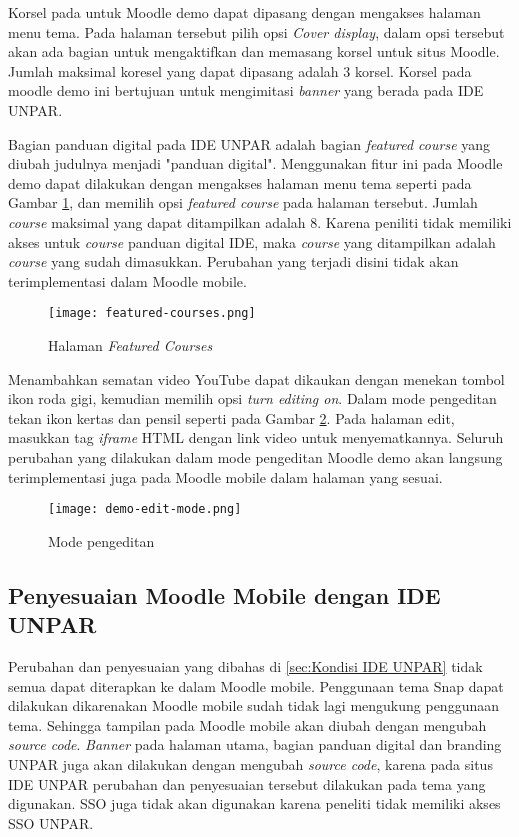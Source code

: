 Korsel pada untuk Moodle demo dapat dipasang dengan mengakses halaman menu tema. Pada halaman tersebut pilih opsi \textit{Cover display}, dalam opsi tersebut akan ada bagian untuk mengaktifkan dan memasang korsel untuk situs Moodle. Jumlah maksimal koresel yang dapat dipasang adalah 3 korsel. Korsel pada moodle demo ini bertujuan untuk mengimitasi \textit{banner} yang berada pada IDE UNPAR.

Bagian panduan digital pada IDE UNPAR adalah bagian \textit{featured course} yang diubah judulnya menjadi "panduan digital". Menggunakan fitur ini pada Moodle demo dapat dilakukan dengan mengakses halaman menu tema seperti pada Gambar \ref{fig:featured courses}, dan memilih opsi \textit{featured course} pada halaman tersebut. Jumlah \textit{course} maksimal yang dapat ditampilkan adalah 8. Karena peniliti tidak memiliki akses untuk \textit{course} panduan digital IDE, maka \textit{course} yang ditampilkan adalah \textit{course} yang sudah dimasukkan. Perubahan yang terjadi disini tidak akan terimplementasi dalam Moodle mobile.

\begin{figure}[H] 
	\centering  
	\texttt{[image: featured-courses.png]}  
	\caption[Halaman \textit{Featured Courses}] {Halaman \textit{Featured Courses}} 
	\label{fig:featured courses} 
\end{figure} 


Menambahkan sematan video YouTube dapat dikaukan dengan menekan tombol ikon roda gigi, kemudian memilih opsi \textit{turn editing on}. Dalam mode pengeditan tekan ikon kertas dan pensil seperti pada Gambar \ref{fig:editingmode}. Pada halaman edit, masukkan tag \textit{iframe} HTML dengan link video untuk menyematkannya. Seluruh perubahan yang dilakukan dalam mode pengeditan Moodle demo akan langsung terimplementasi juga pada Moodle mobile dalam halaman yang sesuai.

\begin{figure}[H] 
	\centering  
	\texttt{[image: demo-edit-mode.png]}  
	\caption[Mode pengeditan] {Mode pengeditan} 
	\label{fig:editingmode} 
\end{figure} 

\subsection{Penyesuaian Moodle Mobile dengan IDE UNPAR}
Perubahan dan penyesuaian yang dibahas di \ref{sec:Kondisi IDE UNPAR} tidak semua dapat diterapkan ke dalam Moodle mobile. Penggunaan tema Snap dapat dilakukan dikarenakan Moodle mobile sudah tidak lagi mengukung penggunaan tema. Sehingga tampilan pada Moodle mobile akan diubah dengan mengubah \textit{source code}. \textit{Banner} pada halaman utama, bagian panduan digital dan branding UNPAR juga akan dilakukan dengan mengubah \textit{source code}, karena pada situs IDE UNPAR perubahan dan penyesuaian tersebut dilakukan pada tema yang digunakan. SSO juga tidak akan digunakan karena peneliti tidak memiliki akses SSO UNPAR.


